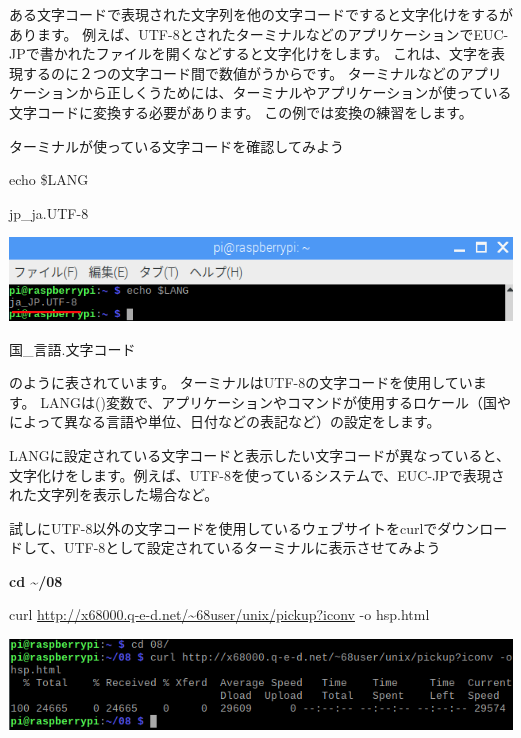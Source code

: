 \documentclass[a4paper,12pt,dvipdfmx]{jarticle}
\begin{document}
ある文字コードで表現された文字列を他の文字コードですると文字化けをするがあります。
例えば、UTF-8とされたターミナルなどのアプリケーションでEUC-JPで書かれたファイルを開くなどすると文字化けをします。
これは、文字を表現するのに２つの文字コード間で数値がうからです。
ターミナルなどのアプリケーションから正しくうためには、ターミナルやアプリケーションが使っている文字コードに変換する必要があります。
この例では変換の練習をします。

ターミナルが使っている文字コードを確認してみよう

echo \$LANG

jp\_ja.UTF-8

\begin{center}
\includegraphics[width=17.006cm]{textbook-img019.png}

\end{center}
国\_言語.文字コード

のように表されています。
ターミナルはUTF-8の文字コードを使用しています。
LANGは()変数で、アプリケーションやコマンドが使用するロケール（国やによって異なる言語や単位、日付などの表記など）の設定をします。


LANGに設定されている文字コードと表示したい文字コードが異なっていると、文字化けをします。例えば、UTF-8を使っているシステムで、EUC-JPで表現された文字列を表示した場合など。


試しにUTF-8以外の文字コードを使用しているウェブサイトをcurlでダウンロードして、UTF-8として設定されているターミナルに表示させてみよう

\textbf{cd {\textasciitilde}/08}

curl \url{http://x68000.q-e-d.net/~68user/unix/pickup?iconv} -o hsp.html

\begin{center}
\includegraphics[width=17.006cm]{textbook-img020.png}

\end{center}
\end{document}
